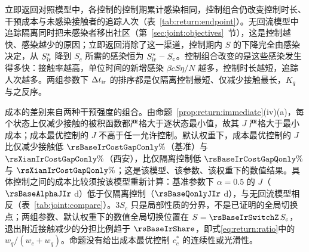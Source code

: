 立即返回对照模型中，各控制的控制期累计感染相同，控制组合仍改变控制时长、干预成本与未感染接触者的追踪人次（表~\ref{tab:return:endpoint}）。无回流模型中追踪隔离同时把未感染者移出社区（第~\ref{sec:joint:objectives}~节），这是控制越快、感染越少的原因；立即返回消除了这一渠道，控制期内 $S$ 的下降完全由感染决定，从 $S^*_{\rm ir}$ 降到 $S_c$ 所需的感染恒为 $S^*_{\rm ir}-S_c$。控制组合改变的是这些感染发生得多快：接触率越高，单位时间的新增感染 $\beta cS\eta/N$ 越多，控制时长越短，追踪人次越多。两组参数下 $\Delta t_{\rm ir}$ 的排序都是仅隔离控制最短、仅减少接触最长，$K_q$ 与之反序。

成本的差别来自两种干预强度的组合。由命题~\ref{prop:return:immediate}(iv)(a)，每个状态上仅减少接触的被积函数都严格大于逐状态最小值，故其 $J$ 严格大于最小成本；成本最优控制的 $J$ 不高于任一允许控制。默认权重下，成本最优控制的 $J$ 比仅减少接触低 $\rsBaseIrCostGapConly\%$（基准）与 $\rsXianIrCostGapConly\%$（西安），比仅隔离控制低 $\rsBaseIrCostGapQonly\%$ 与 $\rsXianIrCostGapQonly\%$；这是该模型、该参数、该权重下的数值结果。具体控制之间的成本比较须按该模型重新计算：基准参数下 $\alpha=0.5$ 的 $J$（$\rsBaseAlphaJIr$ d）低于仅隔离控制（$\rsBaseQonlyJIr$ d），与无回流模型相反（表~\ref{tab:joint:compare}）。$3S_c$ 只是局部性质的分界，不是已证明的全局切换点；两组参数、默认权重下的数值全局切换位置在 $S=\rsBaseIrSwitchZ\,S_c$，退出附近接触减少的分担比例趋于 $\rsBaseIrShare$，即式\eqref{eq:return:ratio}中的 $w_q/(w_c+w_q)$。命题没有给出成本最优控制 $c_c^*$ 的连续性或光滑性。

